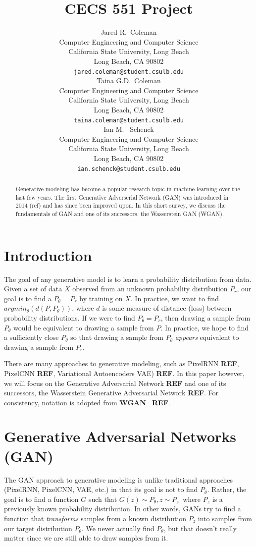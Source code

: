 \documentclass{article}
\title{CECS 551 Project}
\author{%
  Jared R.~Coleman\\
  Computer Engineering and Computer Science\\
  California State University, Long Beach\\
  Long Beach, CA 90802 \\
  \texttt{jared.coleman@student.csulb.edu} \\
  \And 
  Taina G.D.~Coleman\\
  Computer Engineering and Computer Science\\
  California State University, Long Beach\\
  Long Beach, CA 90802 \\
  \texttt{taina.coleman@student.csulb.edu} \\
  \And 
  Ian M. ~Schenck\\
  Computer Engineering and Computer Science\\
  California State University, Long Beach\\
  Long Beach, CA 90802 \\
  \texttt{ian.schenck@student.csulb.edu} \\
}
\begin{document}
\maketitle

\begin{abstract}
  Generative modeling has become a popular research topic in machine learning over the last few years. The first Generative Adverserial Network (GAN) was introduced in 2014 (ref) and has since been improved upon. In this short survey, we discuss the fundamentals of GAN and one of its successors, the Wasserstein GAN (WGAN).
\end{abstract}


\section{Introduction} 
The goal of any generative model is to learn a probability distribution from data. Given a set of data $X$ observed from an unknown probability distribution $P_r$, our goal is to find a $P_{\theta}=P_r$ by training on $X$. In practice, we want to find $argmin_\theta(d(P, P_\theta))$, where $d$ is some measure of distance (loss) between probability distributions. If we were to find $P_\theta=P_r$, then drawing a sample from $P_\theta$ would be equivalent to drawing a sample from $P$. In practice, we hope to find a sufficiently close $P_\theta$ so that drawing a sample from $P_\theta$ \textit{appears} equivalent to drawing a sample from $P_r$.

There are many approaches to generative modeling, such as PixelRNN \textbf{REF}, PixelCNN \textbf{REF}, Variational Autoencoders VAE) \textbf{REF}. In this paper however, we will focus on the Generative Adversarial Network \textbf{REF} and one of its successors, the Wasserstein Generative Adversarial Network \textbf{REF}. For consistency, notation is adopted from \textbf{WGAN\_REF}.

\section{Generative Adversarial Networks (GAN)}


The GAN approach to generative modeling is unlike traditional approaches (PixelRNN, PixelCNN, VAE, etc.) in that its goal is not to find $P_\theta$. Rather, the goal is to find a function $G$ such that $G(z) \sim P_\theta, z \sim P_z~$ where $P_z$ is a previously known probability distribution. In other words, GANs try to find a function that \textit{transforms} samples from a known distribution $P_z$ into samples from our target distribution $P_\theta$. We never actually find $P_\theta$, but that doesn't really matter since we are still able to draw samples from it. 
\end{document}
